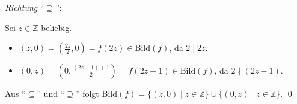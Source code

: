 \documentclass[a4paper,12pt]{article}
\begin{document}
\begin{enumerate}[label=\alph*)]
\textit{Richtung} ``$\supseteq$'':

Sei $z \in \mathbb{Z}$ beliebig.
\begin{itemize}
  \item $(z, 0) = \left(\frac{2z}{2}, 0\right) = f(2z) \in \mathrm{Bild}(f)$,
        da $2 \mid 2z$.
  \item $(0, z) = \left(0, \frac{(2z-1)+1}{2}\right) = f(2z-1) \in \mathrm{Bild}(f)$,
        da $2 \nmid (2z-1)$.
\end{itemize}

Aus ``$\subseteq$'' und ``$\supseteq$'' folgt
$\mathrm{Bild}(f) = \{(z, 0) \mid z \in \mathbb{Z}\} \cup \{(0, z) \mid z \in \mathbb{Z}\}$. \qed

\end{enumerate}
\end{document}
